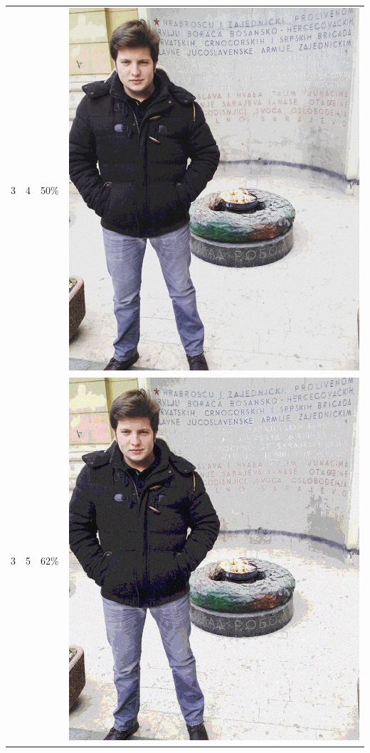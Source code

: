 \documentclass[times, utf8, seminar]{fer}
\begin{document}
\begin{center}
\begin{longtable}{|c|c|c|c|}
3 & 4 &50\% & \includegraphics[scale=0.3]{../benchmark_results/pattern/3_components-4_bits.png} \\
3 & 5 &62\% & \includegraphics[scale=0.3]{../benchmark_results/pattern/3_components-5_bits.png} \\

\end{longtable}
\end{center}
\end{document}
